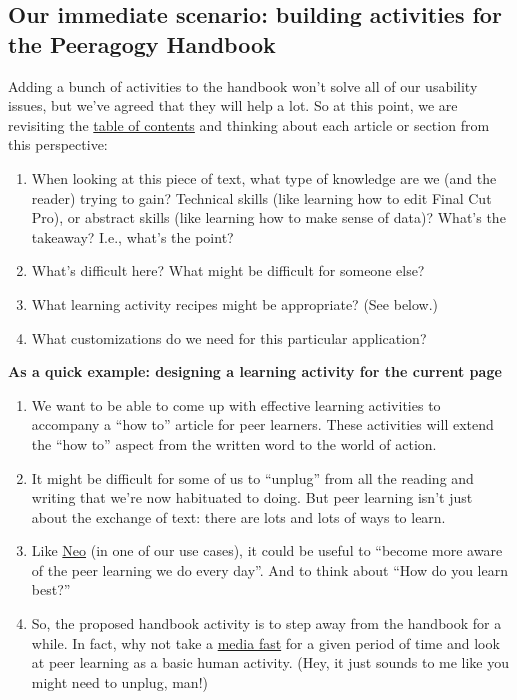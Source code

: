 \subsection{Our immediate scenario: building activities for the
Peeragogy Handbook}

Adding a bunch of activities to the handbook won't solve all of our
usability issues, but we've agreed that they will help a lot. So at this
point, we are revisiting the
\href{http://peeragogy.org/table-of-contents/}{table of contents} and
thinking about each article or section from this perspective:

\begin{enumerate}
\item
  When looking at this piece of text, what type of knowledge are we (and
  the reader) trying to gain? Technical skills (like learning how to
  edit Final Cut Pro), or abstract skills (like learning how to make
  sense of data)? What's the takeaway? I.e., what's the point?
\item
  What's difficult here? What might be difficult for someone else?
\item
  What learning activity recipes might be appropriate? (See below.)
\item
  What customizations do we need for this particular application?
\end{enumerate}
\textbf{\emph{}As a quick example: designing a learning activity for the
current page}

\begin{enumerate}
\item
  We want to be able to come up with effective learning activities to
  accompany a ``how to'' article for peer learners. These activities
  will extend the ``how to'' aspect from the written word to the world
  of action.
\item
  It might be difficult for some of us to ``unplug'' from all the
  reading and writing that we're now habituated to doing. But peer
  learning isn't just about the exchange of text: there are lots and
  lots of ways to learn.
\item
  Like
  \href{http://peeragogy.org/use-cases/paeragogy-helps-solve-complex-problems/}{Neo}
  (in one of our use cases), it could be useful to ``become more aware
  of the peer learning we do every day''. And to think about ``How do
  you learn best?''
\item
  So, the proposed handbook activity is to step away from the handbook
  for a while. In fact, why not take a
  \href{http://zenhabits.net/edit-your-life-part-6-a-media-fast/}{media
  fast} for a given period of time and look at peer learning as a basic
  human activity. (Hey, it just sounds to me like you might need to
  unplug, man!)
\end{enumerate}
